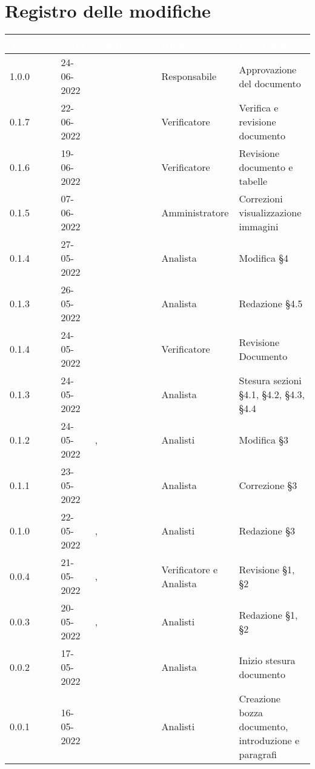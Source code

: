 \section*{Registro delle modifiche}
{

\newlength{\freewidth}
\setlength{\freewidth}{\dimexpr\textwidth-10\tabcolsep}
\renewcommand{\arraystretch}{1.5}
\centering
\setlength{\aboverulesep}{0pt}
\setlength{\belowrulesep}{0pt}
\begin{longtable}{C{.2\freewidth} C{.15\freewidth} C{.26\freewidth} C{.2\freewidth} C{.282379\freewidth}}
	\toprule
{}
\textcolor{white}{\textbf{Versione}}&
\textcolor{white}{\textbf{Data}}&
\textcolor{white}{\textbf{Nominativo}}&
\textcolor{white}{\textbf{Ruolo}}&
\textcolor{white}{\textbf{Descrizione}}\\	
\toprule
\endhead

1.0.0 & 24-06-2022 & \angela{} & Responsabile & Approvazione del documento \\
0.1.7 & 22-06-2022 & \matteo{} & Verificatore & Verifica e revisione documento\\
0.1.6 & 19-06-2022 & \matteo{} & Verificatore & Revisione documento e tabelle \\
0.1.5 & 07-06-2022 & \marcov{} & Amministratore & Correzioni visualizzazione immagini \\
0.1.4 & 27-05-2022 & \giulio{} & Analista & Modifica \S 4 \\
0.1.3 & 26-05-2022 & \giulio{} & Analista & Redazione \S 4.5 \\
0.1.4 & 24-05-2022 & \matteo{} & Verificatore & Revisione Documento \\
0.1.3 & 24-05-2022 & \marcob{} & Analista & Stesura sezioni \S 4.1, \S 4.2, \S 4.3, \S 4.4 \\
0.1.2 & 24-05-2022 & \giulio{}, \angela{} & Analisti & Modifica \S 3 \\
0.1.1 & 23-05-2022 & \giulio{} & Analista & Correzione \S 3 \\
0.1.0 & 22-05-2022 & \angela{}, \giulio{} & Analisti & Redazione \S 3 \\
0.0.4 & 21-05-2022 & \tommaso{}, \giulio{} & Verificatore e Analista & Revisione \S 1, \S 2 \\
0.0.3 & 20-05-2022 & \marcob{}, \angela{} & Analisti & Redazione \S 1, \S 2 \\		
0.0.2 & 17-05-2022 & \marcov{} & Analista & Inizio stesura documento \\
0.0.1 & 16-05-2022 & \teamname{} & Analisti & Creazione bozza documento, introduzione e paragrafi \\	
\bottomrule
\end{longtable}
}
